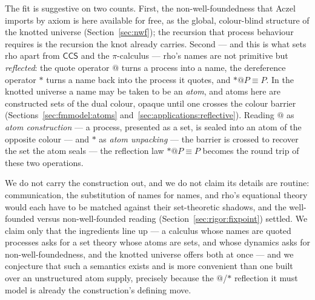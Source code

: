 The fit is suggestive on two counts. First, the non-well-foundedness that Aczel
imports by axiom is here available for free, as the global, colour-blind structure
of the knotted universe (Section~\ref{sec:nwf}); the recursion that process
behaviour requires is the recursion the knot already carries. Second --- and this
is what sets rho apart from $\mathsf{CCS}$ and the $\pi$-calculus --- rho's names
are not primitive but \emph{reflected}: the quote operator $@$ turns a process
into a name, the dereference operator $*$ turns a name back into the process it
quotes, and $*@P \equiv P$. In the knotted universe a name may be taken to be an
\emph{atom}, and atoms here are constructed sets of the dual colour, opaque until
one crosses the colour barrier (Sections~\ref{sec:fmmodel:atoms}
and~\ref{sec:applications:reflective}). Reading $@$ as \emph{atom construction}
--- a process, presented as a set, is sealed into an atom of the opposite colour
--- and $*$ as \emph{atom unpacking} --- the barrier is crossed to recover the set
the atom seals --- the reflection law $*@P \equiv P$ becomes the round trip of
these two operations.

We do not carry the construction out, and we do not claim its details are routine:
communication, the substitution of names for names, and rho's equational theory
would each have to be matched against their set-theoretic shadows, and the
well-founded versus non-well-founded reading (Section~\ref{sec:rigor:fixpoint})
settled. We claim only that the ingredients line up --- a calculus whose names are
quoted processes asks for a set theory whose atoms are sets, and whose dynamics
asks for non-well-foundedness, and the knotted universe offers both at once --- and
we conjecture that such a semantics exists and is more convenient than one built
over an unstructured atom supply, precisely because the $@$/$*$ reflection it must
model is already the construction's defining move.
